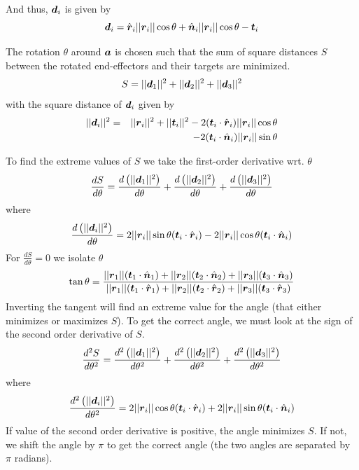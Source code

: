 And thus, $\boldsymbol{d}_i$ is given by
$$\boldsymbol{d}_i =  \hat{\boldsymbol{r}}_i||\boldsymbol{r}_i||\cos\theta + \hat{\boldsymbol{n}}_i||\boldsymbol{r}_i||\cos\theta - \boldsymbol{t}_i$$

The rotation $\theta$ around $\boldsymbol{a}$ is chosen such that the sum of square distances $S$ between the rotated end-effectors and their targets are minimized.
$$S=||\boldsymbol{d}_1||^2+||\boldsymbol{d}_2||^2+||\boldsymbol{d}_3||^2$$
with the square distance of $\boldsymbol{d}_i$ given by
\begin{eqnarray*}
||\boldsymbol{d}_i||^2 &=& ||\boldsymbol{r}_i||^2 + ||\boldsymbol{t}_i||^2 - 2(\boldsymbol{t}_i\cdot\hat{\boldsymbol{r}}_i)||\boldsymbol{r}_i||\cos\theta\\
&& - 2(\boldsymbol{t}_i\cdot\hat{\boldsymbol{n}}_i)||\boldsymbol{r}_i||\sin\theta
\end{eqnarray*}

To find the extreme values of $S$ we take the first-order derivative wrt. $\theta$
$$\dfrac{dS}{d\theta} = \dfrac{d\left(||\boldsymbol{d}_1||^2\right)}{d\theta} + \dfrac{d\left(||\boldsymbol{d}_2||^2\right)}{d\theta} + \dfrac{d\left(||\boldsymbol{d}_3||^2\right)}{d\theta}$$
where
$$\dfrac{d\left(||\boldsymbol{d}_i||^2\right)}{d\theta} = 2||\boldsymbol{r}_i||\sin\theta(\boldsymbol{t}_i\cdot\hat{\boldsymbol{r}}_i) - 2||\boldsymbol{r}_i||\cos\theta(\boldsymbol{t}_i\cdot\hat{\boldsymbol{n}}_i)$$
For $\frac{dS}{d\theta} = 0$ we isolate $\theta$
\begin{eqnarray*}
\tan\theta = \dfrac{||\boldsymbol{r}_1||(\boldsymbol{t}_1\cdot\hat{\boldsymbol{n}}_1) + ||\boldsymbol{r}_2||(\boldsymbol{t}_2\cdot\hat{\boldsymbol{n}}_2) + ||\boldsymbol{r}_3||(\boldsymbol{t}_3\cdot\hat{\boldsymbol{n}}_3)}{||\boldsymbol{r}_1||(\boldsymbol{t}_1\cdot\hat{\boldsymbol{r}}_1) + ||\boldsymbol{r}_2||(\boldsymbol{t}_2\cdot\hat{\boldsymbol{r}}_2) + ||\boldsymbol{r}_3||(\boldsymbol{t}_3\cdot\hat{\boldsymbol{r}}_3)}
\\
\end{eqnarray*}
Inverting the tangent will find an extreme value for the angle (that either minimizes or maximizes $S$).
To get the correct angle, we must look at the sign of the second order derivative of $S$.
\begin{eqnarray*}
\dfrac{d^2S}{d\theta^2} = \dfrac{d^2\left(||\boldsymbol{d}_1||^2\right)}{d\theta^2} + \dfrac{d^2\left(||\boldsymbol{d}_2||^2\right)}{d\theta^2} + \dfrac{d^2\left(||\boldsymbol{d}_3||^2\right)}{d\theta^2}
\end{eqnarray*}
where 
\begin{eqnarray*}
\dfrac{d^2\left(||\boldsymbol{d}_i||^2\right)}{d\theta^2} = 2||\boldsymbol{r}_i||\cos\theta(\boldsymbol{t}_i\cdot\hat{\boldsymbol{r}}_i) + 2||\boldsymbol{r}_i||\sin\theta(\boldsymbol{t}_i\cdot\hat{\boldsymbol{n}}_i)
\end{eqnarray*}
If value of the second order derivative is positive, the angle minimizes $S$. 
If not, we shift the angle by $\pi$ to get the correct angle (the two angles are separated by $\pi$ radians).

